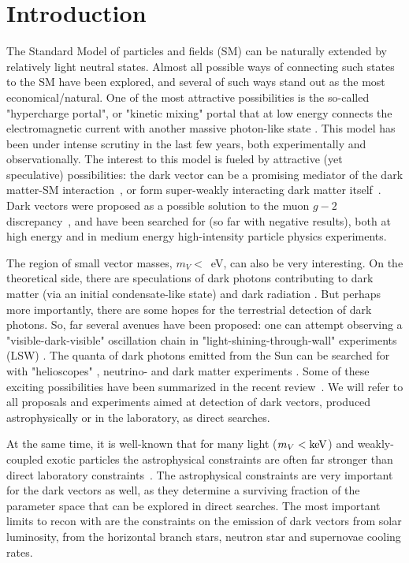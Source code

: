 \documentclass[12pt]{article}
\begin{document}
\section{Introduction}

The Standard Model of particles and fields (SM) can be naturally
extended by relatively light neutral states.  Almost all possible ways
of connecting such states to the SM have been explored, and several of
such ways stand out as the most economical/natural. One of the most
attractive possibilities is the so-called "hypercharge portal", or
"kinetic mixing" portal that at low energy connects the
electromagnetic current with another massive photon-like state
\cite{Holdom:1985ag}.  This model has been under intense scrutiny in
the last few years, both experimentally and observationally.  The
interest to this model is fueled by attractive (yet speculative)
possibilities: the dark vector can be a promising mediator of the dark
matter-SM interaction~\cite{Boehm:2003hm}, or form super-weakly
interacting dark matter
itself~\cite{Pospelov:2008jk,Redondo:2008ec}. Dark vectors were
proposed as a possible solution to the muon $g-2$
discrepancy~\cite{Pospelov:2008zw}, and have been searched for (so far
with negative results), both at high energy and in medium energy
high-intensity particle physics experiments.

The region of small vector masses, $m_V <$~eV, can also be very
interesting.  On the theoretical side, there are speculations of dark
photons contributing to dark matter (via an initial condensate-like
state) \cite{Piazza:2010ye} and dark radiation \cite{Jaeckel:2008fi}.
But perhaps more importantly, there are some hopes for the terrestrial
detection of dark photons. So, far several avenues have been proposed:
one can attempt observing a "visible-dark-visible" oscillation chain in
"light-shining-through-wall" experiments (LSW) \cite{Ahlers:2007qf}.
The quanta of dark photons emitted from the Sun can be searched for
with "helioscopes" \cite{Redondo:2008aa}, neutrino-
\cite{Gninenko:2008pz} and dark matter experiments
\cite{talks,Horvat:2012yv}.  Some of these exciting possibilities have
been summarized in the recent review~\cite{Jaeckel:2010ni}.  We will
refer to all proposals and experiments aimed at detection of dark
vectors, produced astrophysically or in the laboratory, as direct
searches.


At the same time, it is well-known that for many light ($m_V < {\rm
  keV}$) and weakly-coupled exotic particles the astrophysical
constraints are often far stronger than direct laboratory
constraints~\cite{Raffelt:1996wa}. The astrophysical constraints are
very important for the dark vectors as well, as they determine a
surviving fraction of the parameter space that can be explored in
direct searches. The most important limits to recon with are the
constraints on the emission of dark vectors from solar luminosity,
from the horizontal branch stars, neutron star and supernovae cooling rates.
\end{document}
